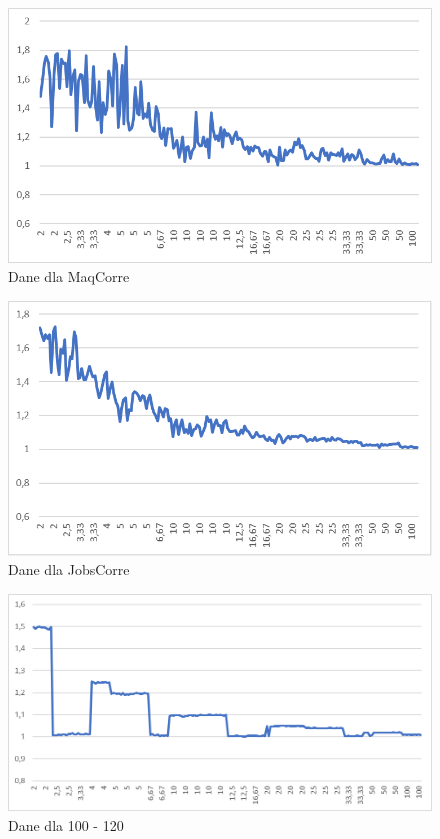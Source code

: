 \begin{figure}[h]
    \centering
    \includegraphics[scale=0.4]{maq.png}
    \caption{Dane dla MaqCorre}
    \label{maq}
\end{figure}

\begin{figure}[h]
    \centering
    \includegraphics[scale=0.4]{job.png}
    \caption{Dane dla JobsCorre}
    \label{job}
\end{figure}

\begin{figure}[h]
    \centering
    \includegraphics[scale=0.33]{100a120.png}
    \caption{Dane dla 100 - 120}
    \label{100-120}
\end{figure}

